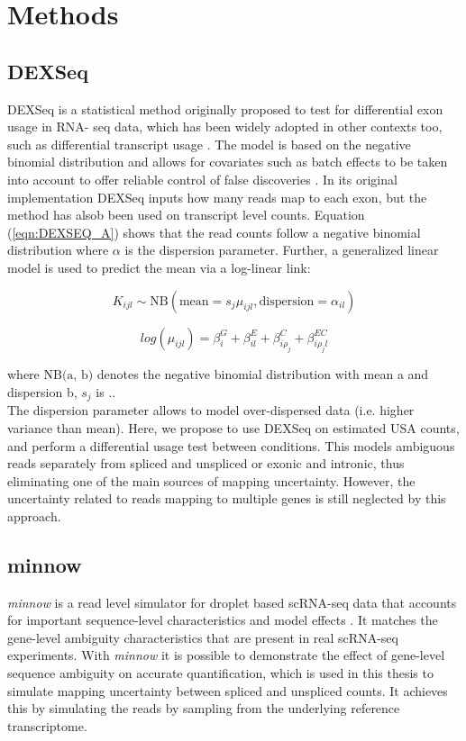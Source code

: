 

\chapter{Methods} 

\section{DEXSeq}
DEXSeq \citep{dexseq} is a statistical method originally proposed to test for differential exon usage in RNA- seq data, which has been widely adopted in other contexts too, such as differential transcript usage \citep{swimming_downstream}. The model is based on the negative binomial distribution and allows for covariates such as batch effects to be taken into account to offer reliable control of false discoveries \citep{dexseq}. In its original implementation DEXSeq inputs how many reads map to each exon, but the method has alsob been used on transcript level counts. Equation (\ref{eqn:DEXSEQ_A}) shows that the read counts follow a negative binomial distribution where $\alpha$ is the dispersion parameter. Further, a generalized linear model is used to predict the mean via a log-linear link:

\begin{equation}
K_{ijl} \sim \text{NB}(\text{mean}=s_j \mu_{ijl}, \text{dispersion}=\alpha_{il})
\label{eqn:DEXSEQ_A}
\end{equation}

\begin{equation}
log(\mu_{ijl}) = \beta^G_i + \beta^E_{il} + \beta_{i \rho_j}^C + \beta^{EC}_{i \rho_j l}
\label{eqn:DEXSEQ_B}
\end{equation}

where $\text{NB(a, b)}$ denotes the negative binomial distribution with mean a and dispersion b, $s_j$ is .. \\

The dispersion parameter allows to model over-dispersed data (i.e. higher variance than mean). Here, we propose to use DEXSeq on estimated USA counts, and perform a differential usage test between conditions. This models ambiguous reads separately from spliced and unspliced or exonic and intronic, thus eliminating one of the main sources of mapping uncertainty. However, the uncertainty related to reads mapping to multiple genes is still neglected by this approach.

\section{minnow}
\emph{minnow} is a read level simulator for droplet based scRNA-seq data that accounts for important sequence-level characteristics and model effects \citep{minnow}. It matches the gene-level ambiguity characteristics that are present in real scRNA-seq experiments. With \emph{minnow} it is possible to demonstrate the effect of gene-level sequence ambiguity on accurate quantification, which is used in this thesis to simulate mapping uncertainty between spliced and unspliced counts. It achieves this by simulating the reads by sampling from the underlying reference transcriptome.

